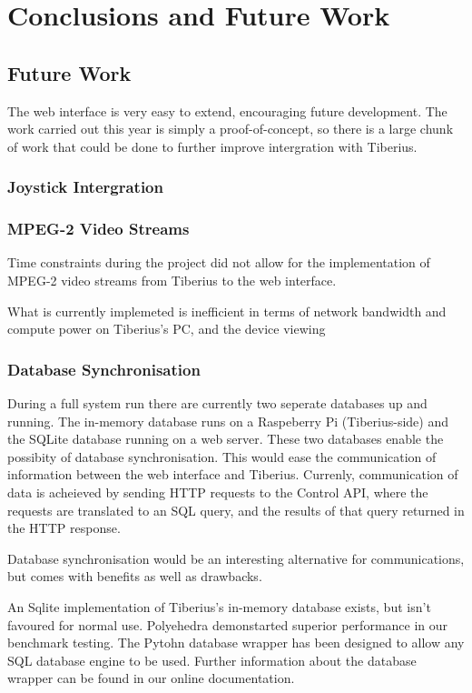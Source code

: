 \section{Conclusions and Future Work}

\subsection{Future Work}
The web interface is very easy to extend, encouraging future development.
The work carried out this year is simply a proof-of-concept, so there is a large
chunk of work that could be done to further improve intergration with Tiberius.

\subsubsection{Joystick Intergration}

\subsubsection{MPEG-2 Video Streams}
Time constraints during the project did not allow for the implementation of
\gls{MPEG-2} video streams from Tiberius to the web interface.

What is currently implemeted is inefficient in terms of network bandwidth and
compute power on Tiberius's PC, and the device viewing

\subsubsection{Database Synchronisation}
During a full system run there are currently two seperate databases up and
running. The in-memory database runs on a Raspeberry Pi (Tiberius-side) and the
SQLite database running on a web server. These two databases enable the
possibity of database synchronisation. This would ease the communication of
information between the web interface and Tiberius. Currenly, communication of
data is acheieved by sending HTTP requests to the Control API, where the
requests are translated to an SQL query, and the results of that query returned
in the HTTP response.

Database synchronisation would be an interesting alternative for communications,
but comes with benefits as well as drawbacks.

An Sqlite implementation of Tiberius's in-memory database exists, but isn't
favoured for normal use. Polyehedra demonstarted superior performance in
our benchmark testing. The Pytohn database wrapper has been designed to allow
any SQL database engine to be used. Further information about the database
wrapper can be found in our online documentation.


